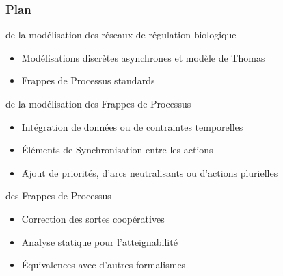 \begin{frame}[c]
\frametitle{Plan}

 de la modélisation des réseaux de régulation biologique
\begin{itemize}
  \item Modélisations discrètes asynchrones et modèle de Thomas
  \item Frappes de Processus standards
\end{itemize}

\pause
\bigskip
{} de la modélisation des Frappes de Processus
\begin{itemize}
  \item Intégration de données ou de contraintes temporelles
  \item Éléments de Synchronisation entre les actions
  \item[] \quad \f Ajout de priorités, d'arcs neutralisants ou d'actions plurielles
\end{itemize}

\pause
\bigskip
{} des Frappes de Processus
\begin{itemize}
  \item Correction des sortes coopératives
  \item Analyse statique pour l'atteignabilité
  \item Équivalences avec d'autres formalismes
\end{itemize}

\end{frame}
